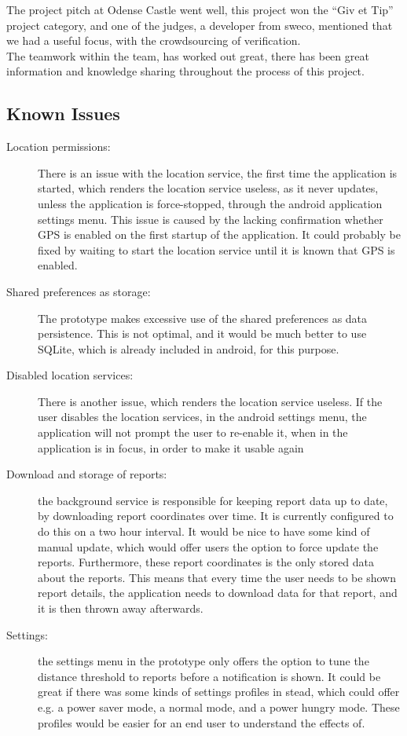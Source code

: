 The project pitch at Odense Castle went well, this project won the “Giv et Tip” project category, and one of the judges, a developer from sweco, mentioned that we had a useful focus, with the crowdsourcing of verification.
~\\
The teamwork within the team, has worked out great, there has been great information and knowledge sharing throughout the process of this project.

\subsection{Known Issues}

\begin{description}
\item [Location permissions:] There is an issue with the location service, the first time the application is started, which renders the location service useless, as it never updates, unless the application is force-stopped, through the android application settings menu. This issue is caused by the lacking confirmation whether GPS is enabled on the first startup of the application. It could probably be fixed by waiting to start the location service until it is known that GPS is enabled.
\item [Shared preferences as storage:] The prototype makes excessive use of the shared preferences as data persistence. This is not optimal, and it would be much better to use SQLite, which is already included in android, for this purpose.
\item [Disabled location services:] There is another issue, which renders the location service useless. If the user disables the location services, in the android settings menu, the application will not prompt the user to re-enable it, when in the application is in focus, in order to make it usable again
\item [Download and storage of reports:] the background service is responsible for keeping report data up to date, by downloading report coordinates over time. It is currently configured to do this on a two hour interval. It would be nice to have some kind of manual update, which would offer users the option to force update the reports. Furthermore, these report coordinates is the only stored data about the reports. This means that every time the user needs to be shown report details, the application needs to download data for that report, and it is then thrown away afterwards.
\item [Settings:] the settings menu in the prototype only offers the option to tune the distance threshold to reports before a notification is shown. It could be great if there was some kinds of settings profiles in stead, which could offer e.g. a power saver mode, a  normal mode, and a power hungry mode. These profiles would be easier for an end user to understand the effects of.

\end{description}

